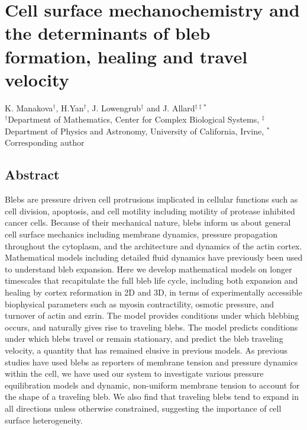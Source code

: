 \chapter[Cellular blebs]{Cell surface mechanochemistry and the determinants of bleb formation, healing and travel velocity}

K. Manakova$^\dag$, H.Yan$^\dag$, J. Lowengrub$^\dag$ and J. Allard$^{\dag\ddag\ast}$\\
$^\dag$Department of Mathematics, Center for Complex Biological Systems, $^\ddag$Department of Physics and Astronomy, University of California, Irvine, $^\ast$Corresponding author \\ 

\section*{Abstract}

Blebs are pressure driven cell protrusions implicated in cellular functions such as cell division, apoptosis, and cell motility including motility of protease inhibited cancer cells. Because of their mechanical nature, blebs inform us about general cell surface mechanics including membrane dynamics, pressure propagation throughout the cytoplasm, and the architecture and dynamics of the actin cortex. Mathematical models including detailed fluid dynamics have previously been used to understand bleb expansion. Here we develop mathematical models on longer timescales that recapitulate the full bleb life cycle, including both expansion and healing by cortex reformation in 2D and 3D, in terms of experimentally accessible biophysical parameters such as myosin contractility, osmotic pressure, and turnover of actin and ezrin. The model provides conditions under which blebbing occurs, and naturally gives rise to traveling blebs. The model predicts conditions under which blebs travel or remain stationary, and predict the bleb traveling velocity, a quantity that has remained elusive in previous models.  As previous studies have used blebs as reporters of membrane tension and pressure dynamics within the cell, we have used our system to investigate various pressure equilibration models and dynamic, non-uniform membrane tension to account for the shape of a traveling bleb. We also find that traveling blebs tend to expand in all directions unless otherwise constrained, suggesting the importance of cell surface heterogeneity. 








